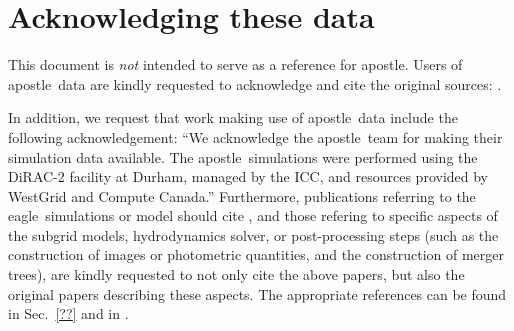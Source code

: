 \documentclass[10pt, a4paper]{article}
\newcommand{\eagle}{{\sc eagle}}
\newcommand{\apostle}{{\sc apostle}}
\begin{document}
\section{Acknowledging these data}
This document is \emph{not} intended to serve as a reference for \apostle.  Users of \apostle\ data are kindly requested to acknowledge and cite the original sources: \cite{2016MNRAS.457.1931S,2016MNRAS.457..844F}.

In addition, we request that work making use of \apostle\ data include the following acknowledgement: ``We acknowledge the \apostle\ team for making their simulation data available. The \apostle\ simulations were performed using the DiRAC-2 facility at Durham, managed by the ICC, and resources provided by WestGrid and Compute Canada.'' Furthermore, publications referring to the \eagle\ simulations or model should cite \cite{2015MNRAS.446..521S,2015MNRAS.450.1937C}, and those refering to specific aspects of the subgrid models, hydrodynamics solver, or post-processing steps (such as the construction of images or photometric quantities, and the construction of merger trees), are kindly requested to not only cite the above papers, but also the original papers describing these aspects. The appropriate references can be found in Sec.~\ref{??} and in \cite{2015MNRAS.446..521S,2015MNRAS.450.1937C}.

\newpage


\end{document}
